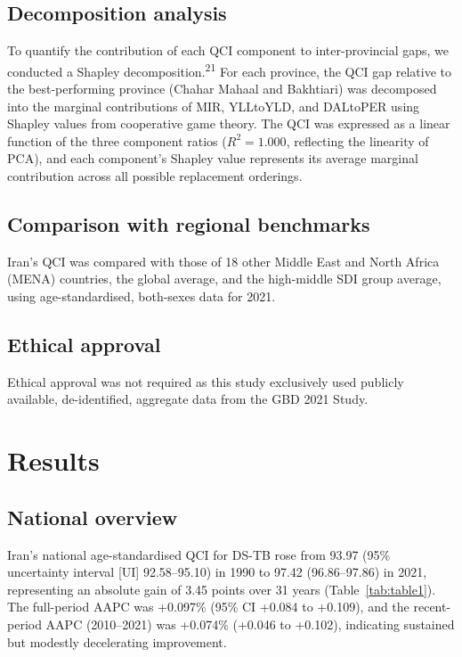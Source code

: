 \documentclass[12pt]{article}
\begin{document}
\subsection{Decomposition analysis}

To quantify the contribution of each QCI component to inter-provincial gaps, we conducted a Shapley decomposition.\textsuperscript{21} For each province, the QCI gap relative to the best-performing province (Chahar Mahaal and Bakhtiari) was decomposed into the marginal contributions of MIR, YLLtoYLD, and DALtoPER using Shapley values from cooperative game theory. The QCI was expressed as a linear function of the three component ratios ($R^2 = 1.000$, reflecting the linearity of PCA), and each component's Shapley value represents its average marginal contribution across all possible replacement orderings.

\subsection{Comparison with regional benchmarks}

Iran's QCI was compared with those of 18 other Middle East and North Africa (MENA) countries, the global average, and the high-middle SDI group average, using age-standardised, both-sexes data for 2021.

\subsection{Ethical approval}

Ethical approval was not required as this study exclusively used publicly available, de-identified, aggregate data from the GBD 2021 Study.


\section{Results}

\subsection{National overview}

Iran's national age-standardised QCI for DS-TB rose from 93.97 (95\% uncertainty interval [UI] 92.58--95.10) in 1990 to 97.42 (96.86--97.86) in 2021, representing an absolute gain of 3.45 points over 31 years (Table~\ref{tab:table1}). The full-period AAPC was +0.097\% (95\% CI +0.084 to +0.109), and the recent-period AAPC (2010--2021) was +0.074\% (+0.046 to +0.102), indicating sustained but modestly decelerating improvement.
\end{document}
